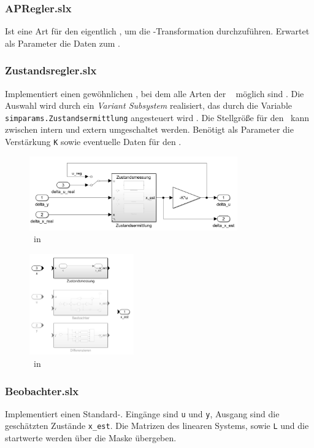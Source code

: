\subsubsection{APRegler.slx}
Ist eine Art  für den eigentlich \zsr, um die \ap-Transformation durchzuführen.
Erwartet als Parameter die Daten zum \ap.

\subsubsection{Zustandsregler.slx}
Implementiert einen gewöhnlichen \zsr, bei dem alle Arten der \ze\  möglich sind .
Die Auswahl wird durch ein \emph{Variant Subsystem} realisiert, das durch die Variable \texttt{simparams.Zustandsermittlung} angesteuert wird .
Die Stellgröße für den \beob\ kann zwischen intern und extern umgeschaltet werden.
Benötigt als Parameter die Verstärkung \texttt{K} sowie eventuelle Daten für den \beob.

\begin{figure}
	\centering
		\includegraphics[width=0.8\textwidth]{Bilder/Simulink/zsr.PNG}
	\caption{\zsr\ in \sm}
	\label{fig:simzsr}
\end{figure}

\begin{figure}
	\centering
		\includegraphics[width=0.4\textwidth]{Bilder/Simulink/zustandsermittlung.PNG}
	\caption{\ze\ in \sm}
	\label{fig:simzse}
\end{figure}

\subsubsection{Beobachter.slx}
Implementiert einen Standard-\beob. 
Eingänge sind \texttt{u} und \texttt{y}, Ausgang sind die geschätzten Zustände \texttt{x\_est}.
Die Matrizen des linearen Systems, sowie \texttt{L} und die \beob startwerte werden über die Maske übergeben.

